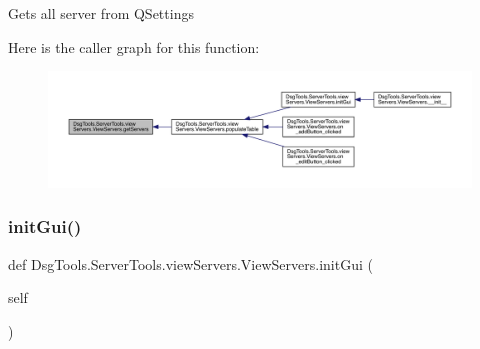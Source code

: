 \begin{DoxyVerb}Gets all server from QSettings
\end{DoxyVerb}
 Here is the caller graph for this function\+:
\nopagebreak
\begin{figure}[H]
\begin{center}
\leavevmode
\includegraphics[width=350pt]{class_dsg_tools_1_1_server_tools_1_1view_servers_1_1_view_servers_a5b7b4496925bd02857abb7a4bbf8649b_icgraph}
\end{center}
\end{figure}
\mbox{\label{class_dsg_tools_1_1_server_tools_1_1view_servers_1_1_view_servers_a3b2e474e4cc3ee41cf86163f98ea5d9c}} 
\subsubsection{\texorpdfstring{init\+Gui()}{initGui()}}
{\footnotesize\ttfamily def Dsg\+Tools.\+Server\+Tools.\+view\+Servers.\+View\+Servers.\+init\+Gui (\begin{DoxyParamCaption}\item[{}]{self }\end{DoxyParamCaption})}

